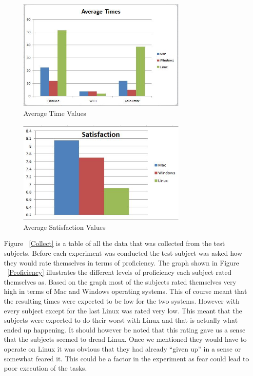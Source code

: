 \documentclass[11pt]{article}
\begin{document}
\begin{figure}[h!]
  \centering
    \includegraphics[width=0.75\textwidth]{./Images/Average_Times}
  \caption{Average Time Values}
 \label{Average}
\end{figure}

\begin{figure}[h!]
  \centering
    \includegraphics[width=0.75\textwidth]{./Images/Satisfaction}
  \caption{Average Satisfaction Values}
 \label{Satis}
\end{figure}

Figure ~\ref{Collect} is a table of all the data that was collected from the test subjects. Before each experiment was conducted the test subject was asked how they would rate themselves in terms of proficiency. The graph shown in Figure ~\ref{Proficiency} illustrates the different levels of proficiency each subject rated themselves as. Based on the graph most of the subjects rated themselves very high in terms of Mac and Windows operating systems. This of course meant that the resulting times were expected to be low for the two systems. However with every subject except for the last Linux was rated very low. This meant that the subjects were expected to do their worst with Linux and that is actually what ended up happening. It should however be noted that this rating gave us a sense that the subjects seemed to dread Linux. Once we mentioned they would have to operate on Linux it was obvious that they had already “given up” in a sense or somewhat feared it. This could be a factor in the experiment as fear could lead to poor execution of the tasks. 
\end{document}
